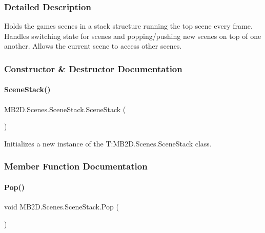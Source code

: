\subsubsection{Detailed Description}
Holds the games scenes in a stack structure running the top scene every frame. Handles switching state for scenes and popping/pushing new scenes on top of one another. Allows the current scene to access other scenes. 



\subsubsection{Constructor \& Destructor Documentation}
\hypertarget{class_m_b2_d_1_1_scenes_1_1_scene_stack_afae8584f72ea2eb6848af3781e7c4137}{}\label{class_m_b2_d_1_1_scenes_1_1_scene_stack_afae8584f72ea2eb6848af3781e7c4137} 
\paragraph{\texorpdfstring{Scene\+Stack()}{SceneStack()}}
{\footnotesize\ttfamily M\+B2\+D.\+Scenes.\+Scene\+Stack.\+Scene\+Stack (\begin{DoxyParamCaption}{ }\end{DoxyParamCaption})\hspace{0.3cm}{\ttfamily [inline]}}



Initializes a new instance of the T\+:\+M\+B2\+D.\+Scenes.\+Scene\+Stack class. 



\subsubsection{Member Function Documentation}
\hypertarget{class_m_b2_d_1_1_scenes_1_1_scene_stack_a134c3aff1731fb86116b78cac7112464}{}\label{class_m_b2_d_1_1_scenes_1_1_scene_stack_a134c3aff1731fb86116b78cac7112464} 
\paragraph{\texorpdfstring{Pop()}{Pop()}}
{\footnotesize\ttfamily void M\+B2\+D.\+Scenes.\+Scene\+Stack.\+Pop (\begin{DoxyParamCaption}{ }\end{DoxyParamCaption})\hspace{0.3cm}{\ttfamily [inline]}}



